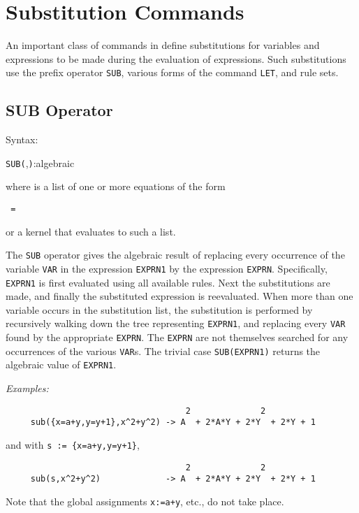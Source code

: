 \chapter{Substitution Commands}
An important class of commands in {\REDUCE} define
substitutions for variables and expressions to be made during the
evaluation of expressions.  Such substitutions use the prefix operator
\texttt{SUB}, various forms of the command \texttt{LET}, and rule sets.

\section{SUB Operator}
\hypertarget{operator:SUB}{}

Syntax:
\begin{syntax}
        \texttt{SUB(},\texttt{)}:algebraic
\end{syntax}
where  is a list of one or more equations of the
form
\begin{syntax}
        \texttt{ = }
\end{syntax}
or a kernel that evaluates to such a list.

The \texttt{SUB} operator gives the algebraic result of replacing every
occurrence of the variable \texttt{VAR} in the expression \texttt{EXPRN1} by the
expression \texttt{EXPRN}.  Specifically, \texttt{EXPRN1} is first evaluated
using all available rules.  Next the substitutions are made, and finally
the substituted expression is reevaluated.  When more than one variable
occurs in the substitution list, the substitution is performed by
recursively walking down the tree representing \texttt{EXPRN1}, and replacing
every \texttt{VAR} found by the appropriate \texttt{EXPRN}.  The \texttt{EXPRN} are
not themselves searched for any occurrences of the various \texttt{VAR}s.
The trivial case \texttt{SUB(EXPRN1)} returns the algebraic value of
\texttt{EXPRN1}.

\textit{Examples:}
\begin{verbatim}
                                    2              2
     sub({x=a+y,y=y+1},x^2+y^2) -> A  + 2*A*Y + 2*Y  + 2*Y + 1
\end{verbatim}
and with \texttt{s := \{x=a+y,y=y+1\}},
\begin{verbatim}
                                    2              2
     sub(s,x^2+y^2)             -> A  + 2*A*Y + 2*Y  + 2*Y + 1
\end{verbatim}
Note that the global assignments \texttt{x:=a+y}, etc., do not take place.


